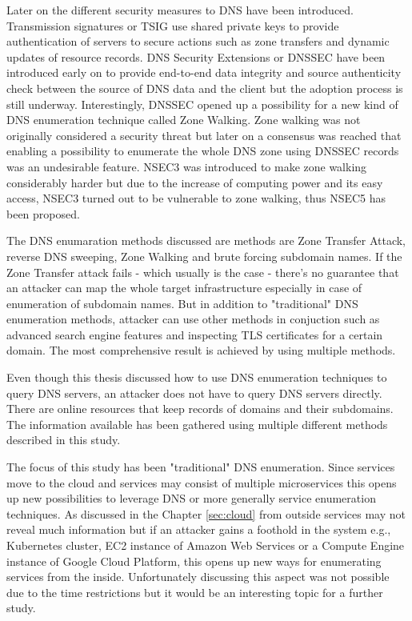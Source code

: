 Later on the different security measures to DNS have been introduced. Transmission signatures or TSIG use shared private keys to provide authentication of servers to secure actions such as zone transfers and dynamic updates of resource records. DNS Security Extensions or DNSSEC have been introduced early on to provide end-to-end data integrity and source authenticity check between the source of DNS data and the client but the adoption process is still underway. Interestingly, DNSSEC opened up a possibility for a new kind of DNS enumeration technique called Zone Walking. Zone walking was not originally considered a security threat but later on a consensus was reached that enabling a possibility to enumerate the whole DNS zone using DNSSEC records was an undesirable feature. NSEC3 was introduced to make zone walking considerably harder but due to the increase of computing power and its easy access, NSEC3 turned out to be vulnerable to zone walking, thus NSEC5 has been proposed.

The DNS enumaration methods discussed are methods are Zone Transfer Attack, reverse DNS sweeping, Zone Walking and brute forcing subdomain names. If the Zone Transfer attack fails - which usually is the case - there's no guarantee that an attacker can map the whole target infrastructure especially in case of enumeration of subdomain names. But in addition to "traditional" DNS enumeration methods, attacker can use other methods in conjuction such as advanced search engine features and inspecting TLS certificates for a certain domain. The most comprehensive result is achieved by using multiple methods.

Even though this thesis discussed how to use DNS enumeration techniques to query DNS servers, an attacker does not have to query DNS servers directly. There are online resources that keep records of domains and their subdomains. The information available has been gathered using multiple different methods described in this study.

The focus of this study has been "traditional" DNS enumeration. Since services move to the cloud and services may consist of multiple microservices this opens up new possibilities to leverage DNS or more generally service enumeration techniques. As discussed in the Chapter \ref{sec:cloud} from outside services may not reveal much information but if an attacker gains a foothold in the system e.g., Kubernetes cluster, EC2 instance of Amazon Web Services or a Compute Engine instance of Google Cloud Platform, this opens up new ways for enumerating services from the inside. Unfortunately discussing this aspect was not possible due to the time restrictions but it would be an interesting topic for a further study.


